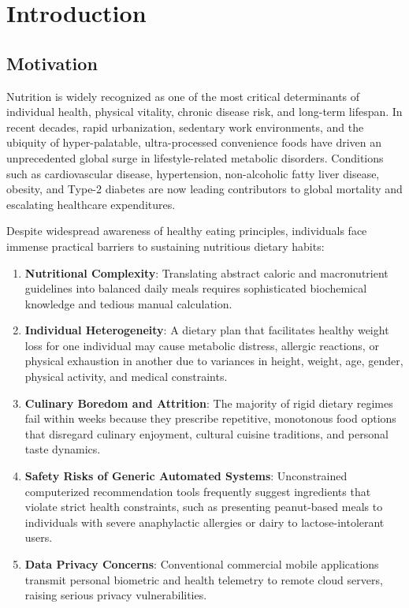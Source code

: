 \documentclass[12pt,a4paper]{report}
\begin{document}
\chapter{Introduction}

\section{Motivation}
Nutrition is widely recognized as one of the most critical determinants of individual health, physical vitality, chronic disease risk, and long-term lifespan. In recent decades, rapid urbanization, sedentary work environments, and the ubiquity of hyper-palatable, ultra-processed convenience foods have driven an unprecedented global surge in lifestyle-related metabolic disorders. Conditions such as cardiovascular disease, hypertension, non-alcoholic fatty liver disease, obesity, and Type-2 diabetes are now leading contributors to global mortality and escalating healthcare expenditures.

Despite widespread awareness of healthy eating principles, individuals face immense practical barriers to sustaining nutritious dietary habits:
\begin{enumerate}
    \item \textbf{Nutritional Complexity}: Translating abstract caloric and macronutrient guidelines into balanced daily meals requires sophisticated biochemical knowledge and tedious manual calculation.
    \item \textbf{Individual Heterogeneity}: A dietary plan that facilitates healthy weight loss for one individual may cause metabolic distress, allergic reactions, or physical exhaustion in another due to variances in height, weight, age, gender, physical activity, and medical constraints.
    \item \textbf{Culinary Boredom and Attrition}: The majority of rigid dietary regimes fail within weeks because they prescribe repetitive, monotonous food options that disregard culinary enjoyment, cultural cuisine traditions, and personal taste dynamics.
    \item \textbf{Safety Risks of Generic Automated Systems}: Unconstrained computerized recommendation tools frequently suggest ingredients that violate strict health constraints, such as presenting peanut-based meals to individuals with severe anaphylactic allergies or dairy to lactose-intolerant users.
    \item \textbf{Data Privacy Concerns}: Conventional commercial mobile applications transmit personal biometric and health telemetry to remote cloud servers, raising serious privacy vulnerabilities.
\end{enumerate}
\end{document}
